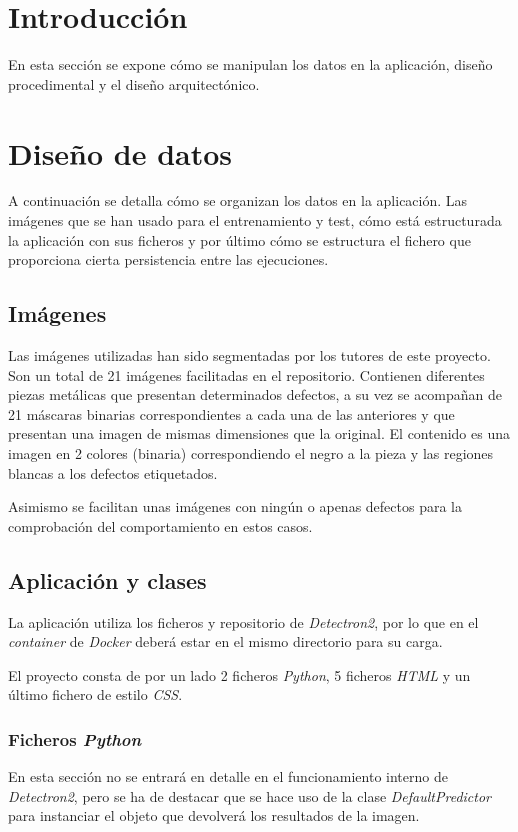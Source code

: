 
\section{Introducción}
En esta sección se expone cómo se manipulan los datos en la aplicación, diseño procedimental y el diseño arquitectónico.

\section{Diseño de datos}
A continuación se detalla cómo se organizan los datos en la aplicación. Las imágenes que se han usado para el entrenamiento y test, cómo está estructurada la aplicación con sus ficheros y por último cómo se estructura el fichero que proporciona cierta persistencia entre las ejecuciones.

\subsection{Imágenes} 
Las imágenes utilizadas han sido segmentadas por los tutores de este proyecto. Son un total de 21 imágenes facilitadas en el repositorio. 
Contienen diferentes piezas metálicas que presentan determinados defectos, a su vez se acompañan de 21 máscaras binarias correspondientes a cada una de las anteriores y que presentan una imagen de mismas dimensiones que la original. El contenido es una imagen en 2 colores (binaria) correspondiendo el negro a la pieza y las regiones blancas a los defectos etiquetados.

Asimismo se facilitan unas imágenes con ningún o apenas defectos para la comprobación del comportamiento en estos casos.

\subsection{Aplicación y clases} 
La aplicación utiliza los ficheros y repositorio de \emph{Detectron2}, por lo que en el \emph{container} de \emph{Docker} deberá estar en el mismo directorio para su carga.

El proyecto consta de por un lado 2 ficheros \emph{Python}, 5 ficheros \emph{HTML} y un último fichero de estilo \emph{CSS}.

\subsubsection{Ficheros \emph{Python}}
En esta sección no se entrará en detalle en el funcionamiento interno de \emph{Detectron2}, pero se ha de destacar que se hace uso de la clase \emph{DefaultPredictor} para instanciar el objeto que devolverá los resultados de la imagen.

